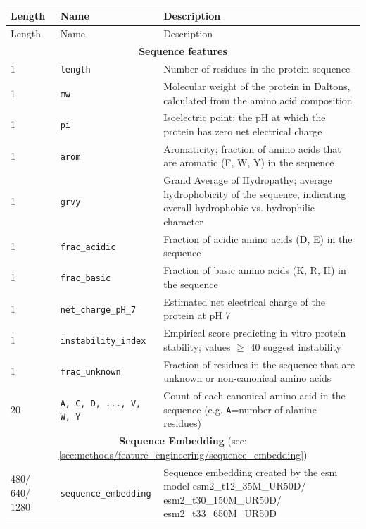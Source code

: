 \begin{longtable}{|p{1.5cm}||p{5cm}|p{8cm}|}
\hline
Length & Name & Description \\
\hline
\endfirsthead

\hline
Length & Name & Description \\[4pt]
\hline
\endhead
\multicolumn{3}{c}{\textbf{Sequence features}} \\[4pt]  %
\hline
1 & \texttt{length} & Number of residues in the protein sequence \\
\hline
1 & \texttt{\gls{mw}} & Molecular weight of the protein in Daltons, calculated from the amino acid composition \\
\hline
1 & \texttt{\gls{pi}} & Isoelectric point; the pH at which the protein has zero net electrical charge  \\
\hline
1 & \texttt{arom} & Aromaticity; fraction of amino acids that are aromatic (F, W, Y) in the sequence  \\
\hline
1 & \texttt{grvy} & Grand Average of Hydropathy; average hydrophobicity of the sequence, indicating overall hydrophobic vs. hydrophilic character \\
\hline
1 &\texttt{frac\_acidic} & Fraction of acidic amino acids (D, E) in the sequence  \\
\hline
1 &\texttt{frac\_basic} & Fraction of basic amino acids (K, R, H) in the sequence  \\
\hline
1 &\texttt{net\_charge\_pH\_7} & Estimated net electrical charge of the protein at pH 7 \\
\hline
1 &\texttt{instability\_index} & Empirical score predicting in vitro protein stability; values $\ge$ 40 suggest instability\\
\hline
1 &\texttt{frac\_unknown} & Fraction of residues in the sequence that are unknown or non-canonical amino acids \\
\hline
20 &\texttt{A, C, D, ..., V, W, Y} & Count of each canonical amino acid in the sequence (e.g. \texttt{A}=number of alanine residues)  \\[4pt]
\hline
\hline
\multicolumn{3}{c}{\textbf{Sequence Embedding} (see: \ref{sec:methods/feature_engineering/sequence_embedding})} \\[4pt]
\hline
480/ 640/ 1280 &\texttt{sequence\_embedding} & Sequence embedding created by the \gls{esm} model esm2\_t12\_35M\_UR50D/ esm2\_t30\_150M\_UR50D/ esm2\_t33\_650M\_UR50D\\[4pt]


\end{longtable}
